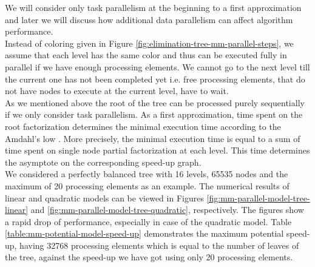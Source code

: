 We will consider only task parallelism at the beginning to a first approximation and later we will discuss how additional data parallelism can affect algorithm performance.\\


Instead of coloring given in Figure \ref{fig:elimination-tree-mm-parallel-steps}, we assume that each level has the same color and thus can be executed fully in parallel if we have enough processing elements. We cannot go to the next level till the current one has not been completed yet i.e. free processing elements, that do not have nodes to execute at the current level, have to wait.\\


As we mentioned above the root of the tree can be processed purely sequentially if we only consider task parallelism. As a first approximation, time spent on the root factorization determines the minimal execution time according to the Amdahl's low \cite{wiki:amdahls-low}. More precisely, the minimal execution time is equal to a sum of time spent on single node partial factorization at each level. This time determines the asymptote on the corresponding speed-up graph.\\


We considered a perfectly balanced tree with 16 levels, 65535 nodes and the maximum of 20 processing elements as an example. The numerical results of linear and quadratic models can be viewed in Figures \ref{fig:mm-parallel-model-tree-linear} and \ref{fig:mm-parallel-model-tree-quadratic}, respectively. The figures show a rapid drop of performance, especially in case of the quadratic model. Table \ref{table:mm-potential-model-speed-up} demonstrates the maximum potential speed-up, having 32768 processing elements which is equal to the number of leaves of the tree, against the speed-up we have got using only 20 processing elements.\\


